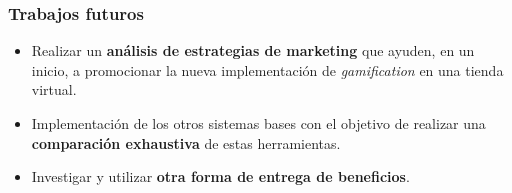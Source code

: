 \documentclass[10pt, compress]{beamer}
\begin{document}
\begin{frame}
 \frametitle{Trabajos futuros}

\begin{itemize}

\item Realizar un \textbf{análisis de estrategias de marketing} que ayuden, en un inicio, a promocionar la nueva
implementación de \emph{gamification} en una tienda virtual.
\item Implementación de los otros sistemas bases con el objetivo de realizar una \textbf{comparación exhaustiva}
de estas herramientas.
\item Investigar y utilizar \textbf{otra forma de entrega de beneficios}.
\end{itemize}
\end{frame}

\maketitle
\end{document}
